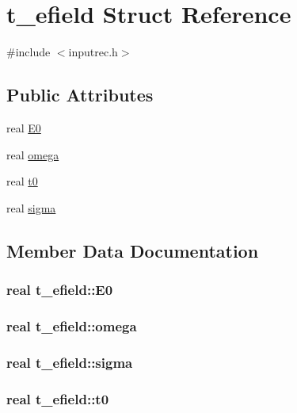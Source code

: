 \hypertarget{structt__efield}{\section{t\-\_\-efield \-Struct \-Reference}
\label{structt__efield}
}


{\ttfamily \#include $<$inputrec.\-h$>$}

\subsection*{\-Public \-Attributes}
\begin{DoxyCompactItemize}
\item 
real \hyperlink{structt__efield_a5938a8c8ae9615085ed9047e37ca4f2c}{\-E0}
\item 
real \hyperlink{structt__efield_a68e9a3c159ec42ed3b99bde1694b8fec}{omega}
\item 
real \hyperlink{structt__efield_a0727246921a0afd2c954bcc545a0ca78}{t0}
\item 
real \hyperlink{structt__efield_a1956c26fc980664297d1769c749a46b2}{sigma}
\end{DoxyCompactItemize}


\subsection{\-Member \-Data \-Documentation}
\hypertarget{structt__efield_a5938a8c8ae9615085ed9047e37ca4f2c}{
\subsubsection[{\-E0}]{\setlength{\rightskip}{0pt plus 5cm}real {\bf t\-\_\-efield\-::\-E0}}}\label{structt__efield_a5938a8c8ae9615085ed9047e37ca4f2c}
\hypertarget{structt__efield_a68e9a3c159ec42ed3b99bde1694b8fec}{
\subsubsection[{omega}]{\setlength{\rightskip}{0pt plus 5cm}real {\bf t\-\_\-efield\-::omega}}}\label{structt__efield_a68e9a3c159ec42ed3b99bde1694b8fec}
\hypertarget{structt__efield_a1956c26fc980664297d1769c749a46b2}{
\subsubsection[{sigma}]{\setlength{\rightskip}{0pt plus 5cm}real {\bf t\-\_\-efield\-::sigma}}}\label{structt__efield_a1956c26fc980664297d1769c749a46b2}
\hypertarget{structt__efield_a0727246921a0afd2c954bcc545a0ca78}{
\subsubsection[{t0}]{\setlength{\rightskip}{0pt plus 5cm}real {\bf t\-\_\-efield\-::t0}}}\label{structt__efield_a0727246921a0afd2c954bcc545a0ca78}


